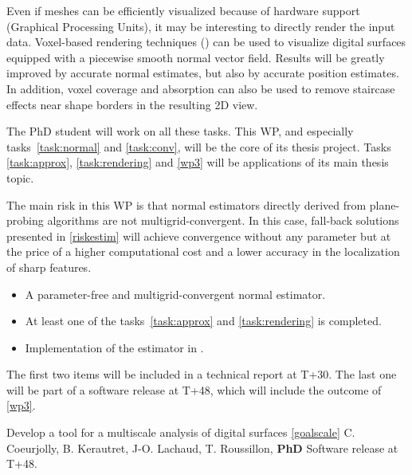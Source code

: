 Even if meshes can be efficiently visualized because of hardware
support (Graphical Processing Units), it may be interesting to
directly render the input data. Voxel-based rendering techniques
(\eg \cite{DBLP:conf/si3d/CrassinNLE09}) can be used to
visualize digital surfaces equipped with a piecewise smooth normal
vector field. Results will be greatly improved by accurate normal estimates,
but also by accurate position estimates. In addition, voxel coverage and absorption can
also be used to remove staircase effects near shape borders in the resulting 2D view.

The PhD student will work on all these tasks. This WP, and especially tasks~\ref{task:normal}
and \ref{task:conv}, will be the core of its thesis project. Tasks \ref{task:approx},
\ref{task:rendering} and \ref{wp3} will be applications of its main thesis topic.  

\Risks
The main risk in this WP is that normal estimators
directly derived from plane-probing algorithms are not multigrid-convergent.
In this case, fall-back solutions presented in \ref{riskestim} will achieve
convergence without any parameter but at the price of a higher computational
cost and a lower accuracy in the localization of sharp features. 

\Success
\begin{itemize}
  \item A parameter-free and multigrid-convergent normal estimator.
  \item At least one of the tasks~\ref{task:approx} and \ref{task:rendering} is completed. 
  \item Implementation of the estimator in \DGtal.
\end{itemize}

The first two items will be included in a technical report at T+30.
The last one will be part of a software release at T+48, which will include
the outcome of \ref{wp3}. 

  

\medskip
{}
   {Develop a tool for a multiscale analysis of digital surfaces \ref{goalscale}}
   {C. Coeurjolly, B. Kerautret, J-O. Lachaud, T. Roussillon, \textbf{PhD}}
   {Software release at T+48.}
\medskip


